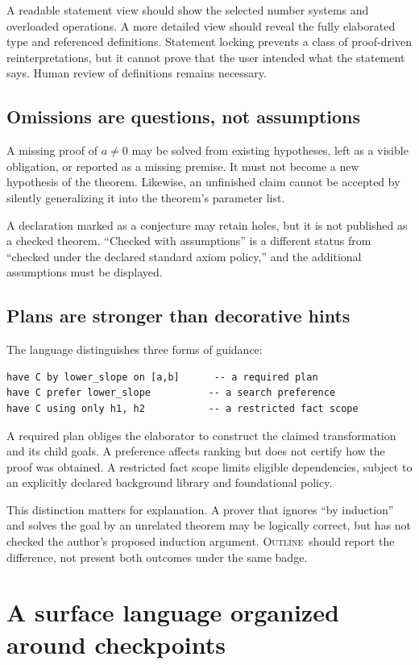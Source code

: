 \documentclass[11pt,a4paper]{article}
\newcommand{\Outline}{\textsc{Outline}}
\theoremstyle{definition}
\theoremstyle{remark}
\numberwithin{equation}{section}
\begin{document}
A readable statement view should show the selected number systems and overloaded operations. A more detailed view should reveal the fully elaborated type and referenced definitions. Statement locking prevents a class of proof-driven reinterpretations, but it cannot prove that the user intended what the statement says. Human review of definitions remains necessary.

\subsection{Omissions are questions, not assumptions}
A missing proof of $a\ne0$ may be solved from existing hypotheses, left as a visible obligation, or reported as a missing premise. It must not become a new hypothesis of the theorem. Likewise, an unfinished claim cannot be accepted by silently generalizing it into the theorem's parameter list.

A declaration marked as a conjecture may retain holes, but it is not published as a checked theorem. ``Checked with assumptions'' is a different status from ``checked under the declared standard axiom policy,'' and the additional assumptions must be displayed.

\subsection{Plans are stronger than decorative hints}
The language distinguishes three forms of guidance:
\begin{lstlisting}
have C by lower_slope on [a,b]      -- a required plan
have C prefer lower_slope          -- a search preference
have C using only h1, h2           -- a restricted fact scope
\end{lstlisting}
A required plan obliges the elaborator to construct the claimed transformation and its child goals. A preference affects ranking but does not certify how the proof was obtained. A restricted fact scope limits eligible dependencies, subject to an explicitly declared background library and foundational policy.

This distinction matters for explanation. A prover that ignores ``by induction'' and solves the goal by an unrelated theorem may be logically correct, but has not checked the author's proposed induction argument. \Outline\ should report the difference, not present both outcomes under the same badge.

\section{A surface language organized around checkpoints}
\label{sec:surface}
\end{document}
